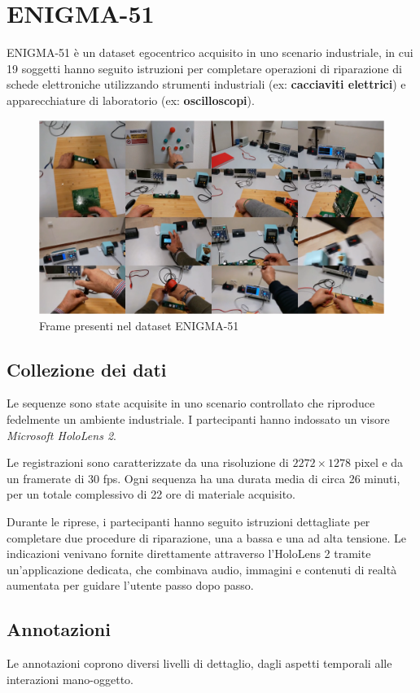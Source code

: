 \section{ENIGMA-51}
ENIGMA-51 è un dataset egocentrico acquisito in uno scenario industriale, in cui 19 soggetti hanno seguito istruzioni per completare operazioni di riparazione di schede elettroniche utilizzando strumenti industriali (ex: \textbf{cacciaviti elettrici}) e apparecchiature di laboratorio (ex: \textbf{oscilloscopi}).  

\begin{figure}[ht]
    \centering
    \includegraphics[width=0.8\linewidth]{Images/enigma_ex.png}
    \caption{Frame presenti nel dataset ENIGMA-51}
\end{figure}

\subsection*{Collezione dei dati}
Le sequenze sono state acquisite in uno scenario controllato che riproduce fedelmente un ambiente industriale. I partecipanti hanno indossato un visore \emph{Microsoft HoloLens 2}.

Le registrazioni sono caratterizzate da una risoluzione di $2272 \times 1278$ pixel e da un framerate di 30 fps. Ogni sequenza ha una durata media di circa 26 minuti, per un totale complessivo di 22 ore di materiale acquisito.  

Durante le riprese, i partecipanti hanno seguito istruzioni dettagliate per completare due procedure di riparazione, una a bassa e una ad alta tensione. Le indicazioni venivano fornite direttamente attraverso l'HoloLens 2 tramite un'applicazione dedicata, che combinava audio, immagini e contenuti di realtà aumentata per guidare l'utente passo dopo passo.

\subsection*{Annotazioni}
Le annotazioni coprono diversi livelli di dettaglio, dagli aspetti temporali alle interazioni mano-oggetto.

